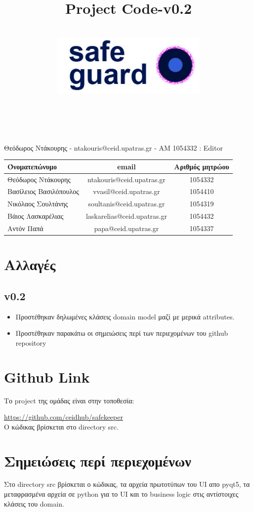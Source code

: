 \documentclass{article}
\title{Project Code-v0.2}
\author{\\
\includegraphics[width=3in]{safeguard}\\[1ex]\\\\
}
\begin{document}
\maketitle

\newpage


Θεόδωρος Ντάκουρης - ntakouris@ceid.upatras.gr - ΑΜ 1054332 : Editor
\\

\begin{tabular}{|l|c|c|}
\hline
Όνοματεπώνυμο & email & Αριθμός μητρώου  \\
\hline
Θεόδωρος Ντάκουρης & ntakouris@ceid.upatras.gr & 1054332 \\
Βασίλειος Βασιλόπουλος & vvasil@ceid.upatras.gr &  1054410 \\
Νικόλαος Σουλτάνης & soultanis@ceid.upatras.gr & 1054319  \\
Βάιος Λασκαρέλιας & laskarelias@ceid.upatras.gr & 1054432 \\
Αντόν Παπά & papa@ceid.upatras.gr & 1054337 \\
\hline
\end{tabular}

\renewcommand{\contentsname}{Περιεχόμενα}
\tableofcontents

\section{Αλλαγές}
\subsection{v0.2}
\begin{itemize}
    \item Προστέθηκαν δηλωμένες κλάσεις domain model μαζί με μερικά attributes.
    \item Προστέθηκαν παρακάτω οι σημειώσεις περί των περιεχομένων του github repository
\end{itemize}

\section{Github Link}

Το project της ομάδας είναι στην τοποθεσία:

\url{https://github.com/ceidhub/safekeeper}
\\
Ο κώδικας βρίσκεται στο directory src.

\section{Σημειώσεις περί περιεχομένων}
Στο directory src βρίσκεται ο κώδικας, τα αρχεία πρωτοτύπων του UI απο pyqt5, τα μεταφρασμένα αρχεία σε python για το UI και το business logic στις αντίστοιχες κλάσεις του domain.
\end{document}
